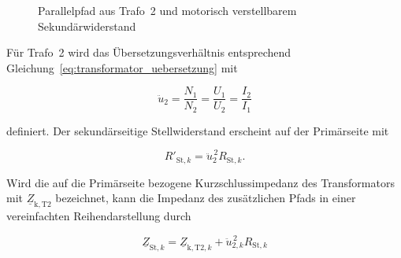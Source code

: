 \begin{figure}[H]
    \centering
    \caption{Parallelpfad aus Trafo~2 und motorisch verstellbarem
    Sekundärwiderstand}
    \label{fig:konzept_trafo2_alle}
\end{figure}

Für Trafo~2 wird das Übersetzungsverhältnis entsprechend
Gleichung~\ref{eq:transformator_uebersetzung} mit

\begin{equation}
    \ddot{u}_{2}
    =
    \frac{N_1}{N_2}
    =
    \frac{U_1}{U_2}
    =
    \frac{I_2}{I_1}
    \label{eq:konzept_trafo2_uebersetzung}
\end{equation}

definiert. Der sekundärseitige Stellwiderstand erscheint auf der Primärseite
mit

\begin{equation}
    R'_{\mathrm{St},k}
    =
    \ddot{u}_{2}^{\,2}R_{\mathrm{St},k}.
    \label{eq:konzept_trafo2_widerstandstransformation}
\end{equation}

Wird die auf die Primärseite bezogene Kurzschlussimpedanz des Transformators
mit $\underline Z_{\mathrm{k,T2}}$ bezeichnet, kann die Impedanz des
zusätzlichen Pfads in einer vereinfachten Reihendarstellung durch

\begin{equation}
    \underline Z_{\mathrm{St},k}
    =
    \underline Z_{\mathrm{k,T2},k}
    +
    \ddot{u}_{2,k}^{\,2}R_{\mathrm{St},k}
    \label{eq:konzept_trafo2_stellpfadimpedanz}
\end{equation}

